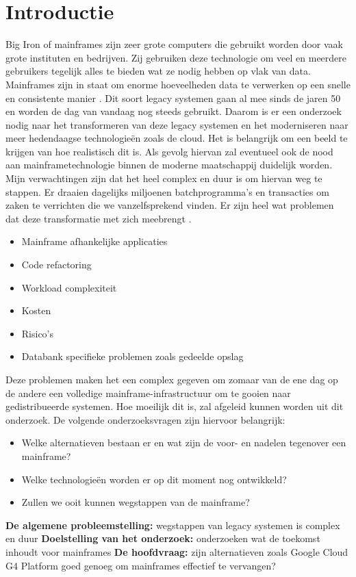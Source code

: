 
\section{Introductie} %
\label{sec:introductie}
Big Iron of mainframes zijn zeer grote computers die gebruikt worden door vaak grote instituten en bedrijven. Zij gebruiken deze technologie om veel en meerdere gebruikers tegelijk alles te bieden wat ze nodig hebben op vlak van data. Mainframes zijn in staat om enorme hoeveelheden data te verwerken op een snelle en consistente manier \autocite{Ebbers2016}. Dit soort legacy systemen gaan al mee sinds de jaren 50 en worden de dag van vandaag nog steeds gebruikt. Daarom is er een onderzoek nodig naar het transformeren van deze legacy systemen en het moderniseren naar meer hedendaagse technologieën zoals de cloud. Het is belangrijk om een beeld te krijgen van hoe realistisch dit is. Als gevolg hiervan zal eventueel ook de nood aan mainframetechnologie binnen de moderne maatschappij duidelijk worden. Mijn verwachtingen zijn dat het heel complex en duur is om hiervan weg te stappen. Er draaien dagelijks miljoenen batchprogramma’s en transacties om zaken te verrichten die we vanzelfsprekend vinden. Er zijn heel wat problemen dat deze transformatie met zich meebrengt  \autocite{Long2018}.
\begin{itemize}
    \item Mainframe afhankelijke applicaties
    \item Code refactoring
    \item Workload complexiteit
    \item Kosten
    \item Risico's
    \item Databank specifieke problemen zoals gedeelde opslag
\end{itemize}
Deze problemen maken het een complex gegeven om zomaar van de ene dag op de andere een volledige mainframe-infrastructuur om te gooien naar gedistribueerde systemen. Hoe moeilijk dit is, zal afgeleid kunnen worden uit dit onderzoek. De volgende onderzoeksvragen zijn hiervoor belangrijk:
\begin{itemize}
    \item Welke alternatieven bestaan er en wat zijn de voor- en nadelen tegenover een mainframe?
    \item Welke technologieën worden er op dit moment nog ontwikkeld?
    \item Zullen we ooit kunnen wegstappen van de mainframe?
\end{itemize}
\textbf{De algemene probleemstelling:} wegstappen van legacy systemen is complex en duur \newline
\textbf{Doelstelling van het onderzoek:} onderzoeken wat de toekomst inhoudt voor mainframes \newline
\textbf{De hoofdvraag:} zijn alternatieven zoals Google Cloud G4 Platform goed genoeg om mainframes effectief te vervangen?

